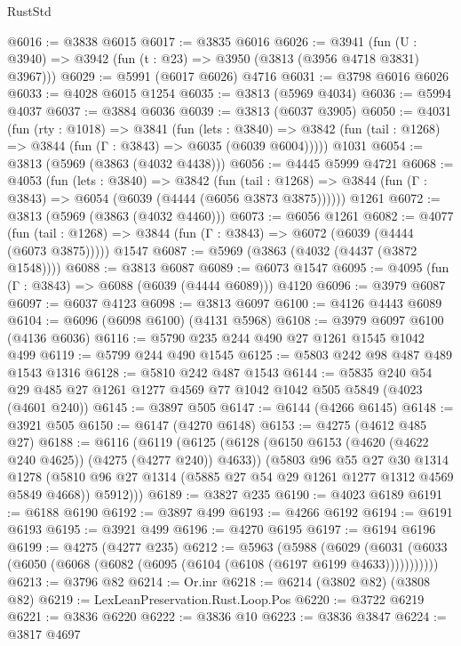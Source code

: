 \begin{lexlean}{RustStd}
\begin{coremodule}
@6016 := @3838 @6015
@6017 := @3835 @6016
@6026 := @3941 (fun (U : @3940) => @3942 (fun (t : @23) => @3950 (@3813 (@3956 @4718 @3831) @3967)))
@6029 := @5991 (@6017 @6026) @4716
@6031 := @3798 @6016 @6026
@6033 := @4028 @6015 @1254
@6035 := @3813 (@5969 @4034)
@6036 := @5994 @4037
@6037 := @3884 @6036
@6039 := @3813 (@6037 @3905)
@6050 := @4031
    (fun (rty : @1018) =>
    @3841
      (fun (lets : @3840) =>
      @3842 (fun (tail : @1268) => @3844 (fun (Γ : @3843) => @6035 (@6039 @6004)))))
    @1031
@6054 := @3813 (@5969 (@3863 (@4032 @4438)))
@6056 := @4445 @5999 @4721
@6068 := @4053
    (fun (lets : @3840) =>
    @3842
      (fun (tail : @1268) => @3844 (fun (Γ : @3843) => @6054 (@6039 (@4444 (@6056 @3873 @3875))))))
    @1261
@6072 := @3813 (@5969 (@3863 (@4032 @4460)))
@6073 := @6056 @1261
@6082 := @4077
    (fun (tail : @1268) => @3844 (fun (Γ : @3843) => @6072 (@6039 (@4444 (@6073 @3875)))))
    @1547
@6087 := @5969 (@3863 (@4032 (@4437 (@3872 @1548))))
@6088 := @3813 @6087
@6089 := @6073 @1547
@6095 := @4095 (fun (Γ : @3843) => @6088 (@6039 (@4444 @6089))) @4120
@6096 := @3979 @6087
@6097 := @6037 @4123
@6098 := @3813 @6097
@6100 := @4126 @4443 @6089
@6104 := @6096 (@6098 @6100) (@4131 @5968)
@6108 := @3979 @6097 @6100 (@4136 @6036)
@6116 := @5790 @235 @244 @490 @27 @1261 @1545 @1042 @499
@6119 := @5799 @244 @490 @1545
@6125 := @5803 @242 @98 @487 @489 @1543 @1316
@6128 := @5810 @242 @487 @1543
@6144 := @5835
    @240
    @54
    @29
    @485
    @27
    @1261
    @1277
    @4569
    @77
    @1042
    @1042
    @505
    @5849
    (@4023 (@4601 @240))
@6145 := @3897 @505
@6147 := @6144 (@4266 @6145)
@6148 := @3921 @505
@6150 := @6147 (@4270 @6148)
@6153 := @4275 (@4612 @485 @27)
@6188 := @6116
    (@6119
      (@6125
        (@6128 (@6150 @6153 (@4620 (@4622 @240 @4625)) (@4275 (@4277 @240)) @4633))
        (@5803
          @96
          @55
          @27
          @30
          @1314
          @1278
          (@5810 @96 @27 @1314 (@5885 @27 @54 @29 @1261 @1277 @1312 @4569 @5849 @4668))
          @5912)))
@6189 := @3827 @235
@6190 := @4023 @6189
@6191 := @6188 @6190
@6192 := @3897 @499
@6193 := @4266 @6192
@6194 := @6191 @6193
@6195 := @3921 @499
@6196 := @4270 @6195
@6197 := @6194 @6196
@6199 := @4275 (@4277 @235)
@6212 := @5963
    (@5988
      (@6029 (@6031 (@6033 (@6050 (@6068 (@6082 (@6095 (@6104 (@6108 (@6197 @6199 @4633)))))))))))
@6213 := @3796 @82
@6214 := Or.inr
@6218 := @6214 (@3802 @82) (@3808 @82)
@6219 := LexLeanPreservation.Rust.Loop.Pos
@6220 := @3722 @6219
@6221 := @3836 @6220
@6222 := @3836 @10
@6223 := @3836 @3847
@6224 := @3817 @4697

\end{coremodule}
\end{lexlean}
